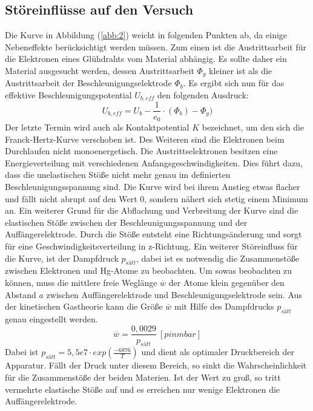 \subsection{Störeinflüsse auf den Versuch}
Die Kurve in Abbildung (\ref{abb:2}) weicht in folgenden Punkten ab, da einige Nebeneffekte berücksichtigt werden müssen.
Zum einen ist die Austrittsarbeit für die Elektronen eines Glühdrahts vom Material abhängig.
Es sollte daher ein Material ausgesucht werden, dessen Austrittsarbeit $\Phi_g$ kleiner ist als die
Austrittsarbeit der Beschleunigungselektrode $\Phi_b$.
Es ergibt sich nun für das effektive Beschleunigungspotential $U_{b,eff}$ den folgenden Ausdruck:
\begin{equation}
  U_{b,eff} = U_b - \frac{1}{e_0} \cdot (\Phi_b) - \Phi_g)
  \label{eq:5}
\end{equation}
Der letzte Termin wird auch als Kontaktpotential $K$ bezeichnet, um den sich die Franck-Hertz-Kurve verschoben ist.
Des Weiteren sind die Elektronen beim Durchlaufen nicht monoenergetisch.
Die Austrittselektronen besitzen eine Energieverteilung mit verschiedenen Anfangsgeschwindigkeiten.
Dies führt dazu, dass die unelastischen Stöße nicht mehr genau im definierten Beschleunigungsspannung sind.
Die Kurve wird bei ihrem Anstieg etwas flacher und fällt nicht abrupt auf den Wert 0, sondern nähert sich stetig einem Minimum an.
Ein weiterer Grund für die Abflachung und Verbreitung der Kurve sind die elastischen Stöße zwischen der Beschleunigungsspannung
und der Auffängerelektrode. Durch die Stöße entsteht eine Richtungsänderung und sorgt für eine Geschwindigkeitsverteilung in
z-Richtung.
Ein weiterer Störeinfluss für die Kurve, ist der Dampfdruck $p_{sätt}$, dabei ist es notwendig die
Zusammenstöße zwischen Elektronen und Hg-Atome zu beobachten. Um sowas beobachten zu können,
muss die mittlere freie Weglänge $\overline{w}$ der Atome klein gegenüber den Abstand $a$ zwischen Auffängerelektrode und Beschleunigungselektrode
sein.
Aus der kinetischen Gastheorie kann die Größe $\overline{w}$ mit Hilfe des Dampfdrucks $p_{sätt}$
genau eingestellt werden.
\begin{equation}
  \overline{w} = \frac{0,0029}{p_{sätt}} \ [p in mbar]
  \label{eq:6}
\end{equation}
Dabei ist $p_{sätt} = 5,5e7 \cdot exp(\frac{-6876}{T})$ und dient als optimaler Druckbereich der Apparatur.
Fällt der Druck unter diesem Bereich,
so sinkt die Wahrscheinlichkeit für die Zusammenstöße der beiden Materien. Ist der Wert zu groß, so tritt
vermehrte elastische Stöße auf und es erreichen nur wenige Elektronen die Auffängerelektrode.
